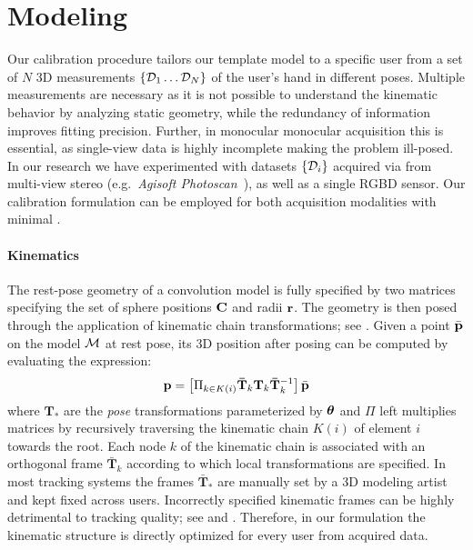 
\section{Modeling}
\label{sec:modeling}

Our calibration procedure tailors our template model to a specific user from a set of $N$ 3D measurements $\{ \mathcal{D}_1 \dots \mathcal{D}_N \}$ of the user's hand in different poses. Multiple measurements are necessary as it is not possible to understand the kinematic behavior by analyzing static geometry, while the redundancy of information improves fitting precision. Further, in monocular monocular acquisition this is essential, as single-view data is highly incomplete making the problem ill-posed. In our research we have experimented with datasets $\{\mathcal{D}_i\}$ acquired via from multi-view stereo (e.g.\ \emph{Agisoft Photoscan~\textcopyright}), as well as a single RGBD sensor. Our calibration formulation can be employed for both acquisition modalities with minimal .


\paragraph{Kinematics}
The rest-pose geometry of a convolution model is fully specified by two matrices specifying the set of sphere positions ${\mathbf{C}}$ and radii ${\mathbf{r}}$. The geometry is then posed through the application of  kinematic chain transformations; see . Given a point $\bar{\mathbf{p}}$ on the model $\mathcal{M}$ at rest pose, its 3D position after posing can be computed by evaluating the expression:
% 
\begin{equation}
\mathbf{p} = \left[ \Pi_{k \in K(i)} \mathbf{\bar{T}}_k \mathbf{T}_k \mathbf{\bar{T}}_k^{-1} \right] \bar{\mathbf{p}}
\label{eq:kinematic}
\end{equation}
%
where $\mathbf{T}_*$ are the \emph{pose} transformations parameterized by $\boldsymbol{\theta}$ and $\Pi$ left multiplies matrices by recursively traversing the kinematic chain $K(i)$ of element $i$ towards the root. Each node $k$ of the kinematic chain is associated with an orthogonal frame $\mathbf{\bar{T}}_k$ according to which local transformations are specified. In most tracking systems the frames $\mathbf{\bar{T}}_*$ are manually set by a 3D modeling artist and kept fixed across users. Incorrectly specified kinematic frames can be highly detrimental to tracking quality; see  and . Therefore, in our formulation the kinematic structure is directly optimized for every user from acquired data.

